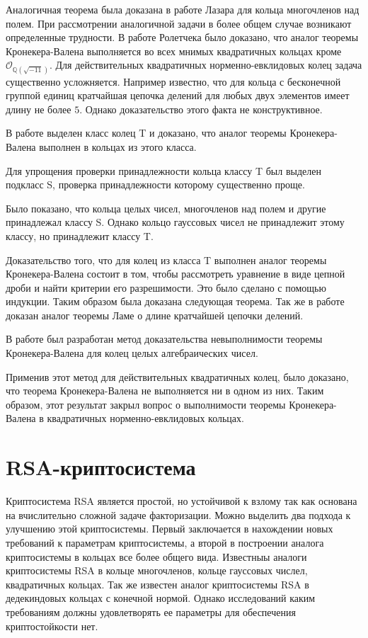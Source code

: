 \documentclass[a4paper,12pt]{article} %
\begin{document}
Аналогичная теорема была доказана в работе Лазара для кольца многочленов над полем.
При рассмотрении аналогичной задачи в более общем случае возникают определенные трудности.
В работе Ролетчека было доказано, что аналог теоремы Кронекера-Валена выполняется во всех мнимых квадратичных кольцах кроме $\mathcal{O}_{\mathbb{Q}(\sqrt{-11})}$.
Для действительных квадратичных норменно-евклидовых колец задача существенно усложняется.
Например известно, что для кольца с бесконечной группой единиц кратчайшая цепочка делений для любых двух элементов имеет длину не более $5$.
Однако доказательство этого факта не конструктивное.

В работе выделен класс колец T и доказано, что аналог теоремы Кронекера-Валена выполнен в кольцах из этого класса.

Для упрощения проверки принадлежности кольца классу T был выделен подкласс S, проверка принадлежности которому существенно проще.

Было показано, что кольца целых чисел, многочленов над полем и другие принадлежал классу S.
Однако кольцо гауссовых чисел не принадлежит этому классу, но принадлежит классу T.

Доказательство того, что для колец из класса T выполнен аналог теоремы Кронекера-Валена состоит в том, чтобы рассмотреть уравнение в виде цепной дроби и найти критерии его разрешимости.
Это было сделано с помощью индукции.
Таким образом была доказана следующая теорема.
Так же в работе доказан аналог теоремы Ламе о длине кратчайшей цепочки делений.

В работе был разработан метод доказательства невыполнимости теоремы Кронекера-Валена для колец целых алгебраических чисел.

Применив этот метод для действительных квадратичных колец, было доказано, что теорема Кронекера-Валена не выполняется ни в одном из них.
Таким образом, этот результат закрыл вопрос о выполнимости теоремы Кронекера-Валена в квадратичных норменно-евклидовых кольцах.

\section{RSA-криптосистема}

Криптосистема RSA является простой, но устойчивой к взлому так как основана на вчислительно сложной задаче факторизации.
Можно выделить два подхода к улучшению этой криптосистемы.
Первый заключается в нахождении новых требований к параметрам криптосистемы, а второй в построении аналога криптосистемы в кольцах все более общего вида.
Известныы аналоги криптосистемы RSA в кольце многочленов, кольце гауссовых числел, квадратичных кольцах.
Так же известен аналог криптосистемы RSA в дедекиндовых кольцах с конечной нормой.
Однако исследований каким требованиям должны удовлетворять ее параметры для обеспечения криптостойкости нет.
\end{document}

